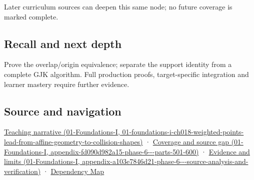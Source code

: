 Later curriculum sources can deepen this same node; no future coverage is marked complete.

\subsection{Recall and next depth}\label{appendix-215ac7099a82-recall-and-next-depth}

Prove the overlap/origin equivalence; separate the support identity from a complete GJK algorithm. Full production proofs, target-specific integration and learner mastery require further evidence.

\subsection{Source and navigation}\label{appendix-215ac7099a82-source-and-navigation}

\href{../01-Foundations-I/main.pdf\#nameddest=01-foundations-i-ch018-weighted-points-lead-from-affine-geometry-to-collision-shapes}{Teaching narrative (01-Foundations-I, 01-foundations-i-ch018-weighted-points-lead-from-affine-geometry-to-collision-shapes)} · \href{../01-Foundations-I/main.pdf\#nameddest=appendix-fd090d982a15-phase-6---parts-501-600}{Coverage and source gap (01-Foundations-I, appendix-fd090d982a15-phase-6-\/-\/-parts-501-600)} · \href{../01-Foundations-I/main.pdf\#nameddest=appendix-a103e7846d21-phase-6---source-analysis-and-verification}{Evidence and limits (01-Foundations-I, appendix-a103e7846d21-phase-6-\/-\/-source-analysis-and-verification)} · \hyperref[appendix-4ad47bdd269a]{Dependency Map}
